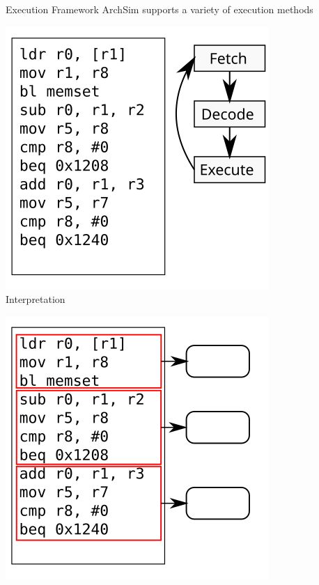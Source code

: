 \begin{frame}{Execution Framework}
ArchSim supports a variety of execution methods
\bigskip

\centering
\begin{minipage}{0.27\textwidth}
\includegraphics[width=\textwidth]{figures/mode-interpret}\\
\smallskip
\centering
\footnotesize{Interpretation}
\end{minipage}
\qquad
\begin{minipage}{0.27\textwidth}
\includegraphics[width=\textwidth]{figures/mode-blockjit}\\

\end{minipage}
\end{frame}
